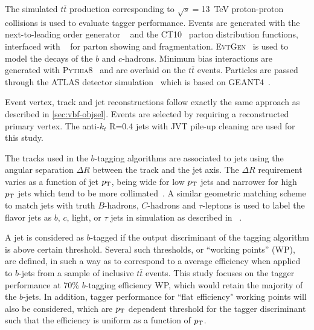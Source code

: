The simulated $t\bar{t}$ production corresponding to $\sqrt{s}=$13~TeV proton-proton
collisions is used to evaluate tagger performance. Events are generated with the
next-to-leading order generator \powheg{}~\cite{bib:powheg} and the \textsc{CT10}~\cite{Lai:2010vv}
parton distribution functions, interfaced with \pythia{}~\cite{pythia2} for parton showing and
fragmentation. \textsc{EvtGen}~\cite{Lange:2001uf} is used to model the decays of
the $b$ and $c$-hadrons. Minimum bias interactions are generated with \textsc{Pythia8}~\cite{Pythia8}
and are overlaid on the $t\bar{t}$ events. Particles are passed through the ATLAS detector
simulation~\cite{atlas_simulation} which is based on \textsc{GEANT4}~\cite{geant}.

Event vertex, track and jet reconstructions follow exactly the same approach as described in \ref{sec:vbf-objsel}.
Events are selected by requiring a reconstructed primary vertex. The anti-$k_t$ R=0.4 jets with JVT pile-up cleaning are used for this study.

The tracks used in the $b$-tagging algorithms are associated to jets
using the angular separation $\Delta R$ between the track and the jet axis.
The $\Delta R$ requirement varies as a function of jet $p_{{\rm T}}$,
being wide for low $p_{{\rm T}}$ jets and narrower for high $p_{{\rm T}}$ jets which tend to be more
collimated~\cite{ref:btagPaper}.
A similar geometric matching scheme to match jets with truth $B$-hadrons, $C$-hadrons and $\tau$-leptons
is used to label the flavor jets as $b$, $c$, light, or $\tau$ jets in simulation as described in ~\cite{ATL-PHYS-PUB-2015-022}.

A jet is considered as $b$-tagged if the output
discriminant of the tagging algorithm
is above certain threshold. Several such thresholds,
or ``working points'' (WP), are defined, in such a way as to correspond to
a average efficiency when applied to $b$-jets from a sample of
inclusive $t\bar{t}$ events. This study focuses on the tagger performance at
70\% $b$-tagging efficiency WP, which would retain the majority of the $b$-jets.
In addition, tagger performance for ``flat efficiency" working points will also be considered,
which are $p_{{\rm T}}$ dependent threshold for the tagger discriminant such that the \btagging efficiency
is uniform as a function of $p_{{\rm T}}$.
